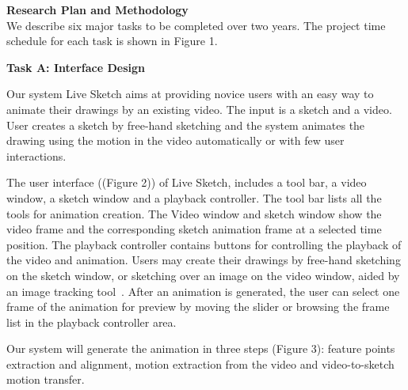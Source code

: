\newpage

\textbf{Research Plan and Methodology}\\

We describe six major tasks to be completed over two years. The project time schedule for each task is shown in Figure 1. 

%

\textbf{Task A: Interface Design}

Our system Live Sketch aims at providing novice users with an easy way to animate their drawings by an existing video. The input is a sketch and a video.
User creates a sketch by free-hand sketching and the system animates the drawing using the motion in the video automatically or with few user interactions.

The user interface ((Figure 2)) of Live Sketch, includes a tool bar, a video window, a sketch window and a playback controller. 
The tool bar lists all the tools for animation creation. 
The Video window and sketch window show the video frame and the corresponding sketch animation frame at a selected time position. 
The playback controller contains buttons for controlling the playback of the video and animation.
Users may create their drawings by free-hand sketching on the sketch window, or sketching over an image on the video window, aided by an image tracking tool~\cite{EZSketching:2014}. 
After an animation is generated, the user can select one frame of the animation for preview by moving the slider or browsing the frame list in the playback controller area.

Our system will generate the animation in three steps (Figure 3): feature points extraction and alignment, motion extraction from the video and video-to-sketch motion transfer.

